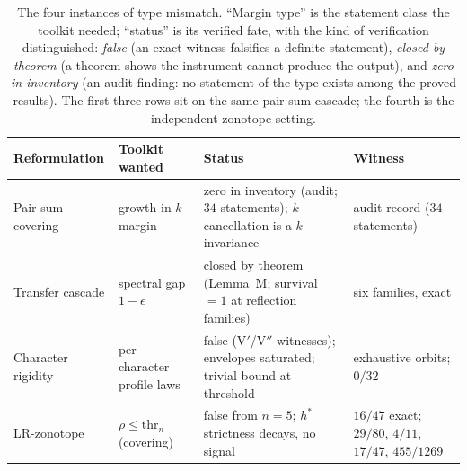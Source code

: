 \begin{table}[htbp]
\centering
\small
\caption{The four instances of type mismatch. ``Margin type'' is the
statement class the toolkit needed; ``status'' is its verified fate,
with the kind of verification distinguished: \emph{false} (an exact
witness falsifies a definite statement), \emph{closed by theorem} (a
theorem shows the instrument cannot produce the output), and
\emph{zero in inventory} (an audit finding: no statement of the type
exists among the proved results). The first three rows sit on the same
pair-sum cascade; the fourth is the independent zonotope setting.}
\label{tab:instances}
\begin{tabularx}{\textwidth}{@{} l >{\raggedright\arraybackslash}X
>{\raggedright\arraybackslash}X l @{}}
\toprule
Reformulation & Toolkit wanted & Status & Witness \\
\midrule
Pair-sum covering & growth-in-$k$ margin & zero in inventory (audit;
$34$ statements); $k$-cancellation is a $k$-invariance & audit record
($34$ statements) \\
Transfer cascade & spectral gap $1-\epsilon$ & closed by theorem
(Lemma~M; survival $=1$ at reflection families) & six families, exact \\
Character rigidity & per-character profile laws & false (V$'$/V$''$
witnesses); envelopes saturated; trivial bound at threshold &
exhaustive orbits; $0/32$ \\
LR-zonotope & $\rho\le\mathrm{thr}_n$ (covering) & false from $n=5$;
$h^*$ strictness decays, no signal & $16/47$ exact; $29/80$, $4/11$,
$17/47$, $455/1269$ \\
\bottomrule
\end{tabularx}
\end{table}
